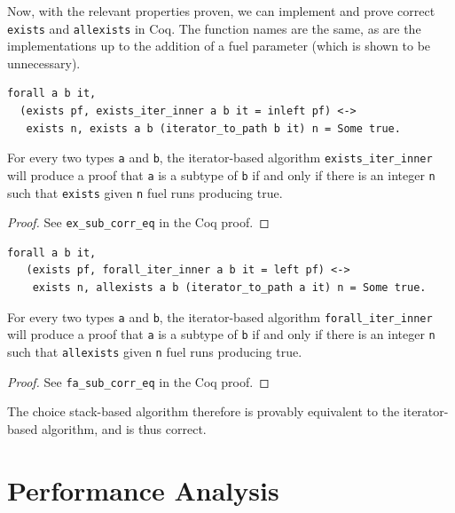 \documentclass[a4paper,english]{lipics-v2019}
\begin{document}
Now, with the relevant properties proven, we can implement and prove correct
\verb|exists| and \verb|allexists| in Coq. The function names are the
same, as are the implementations up to the addition of a fuel parameter (which
is shown to be unnecessary). 

\begin{lemma}
\begin{small}\begin{verbatim}
forall a b it, 
  (exists pf, exists_iter_inner a b it = inleft pf) <->
   exists n, exists a b (iterator_to_path b it) n = Some true.
\end{verbatim}\end{small}
For every two types \verb|a| and \verb|b|, the iterator-based algorithm
\verb|exists_iter_inner| will produce a proof that \verb|a| is a subtype
of \verb|b| if and only if there is an integer \verb|n| such that
 \verb|exists| given \verb|n| fuel runs producing true.
\end{lemma}
\begin{proof}
See \verb|ex_sub_corr_eq| in the Coq proof.
\end{proof}

\begin{lemma}
\begin{small}\begin{verbatim}
forall a b it,
   (exists pf, forall_iter_inner a b it = left pf) <->
    exists n, allexists a b (iterator_to_path a it) n = Some true.
\end{verbatim}
\end{small}  
For every two types \verb|a| and \verb|b|, the iterator-based algorithm
\verb|forall_iter_inner| will produce a proof that \verb|a| is a subtype
of \verb|b| if and only if there is an integer \verb|n| such that
 \verb|allexists| given \verb|n| fuel runs producing true.
\end{lemma}
\begin{proof}
See \verb|fa_sub_corr_eq| in the Coq proof.
\end{proof}

The choice stack-based algorithm therefore is provably equivalent to the
iterator-based algorithm, and is thus correct.

\section{Performance Analysis}
\end{document}
